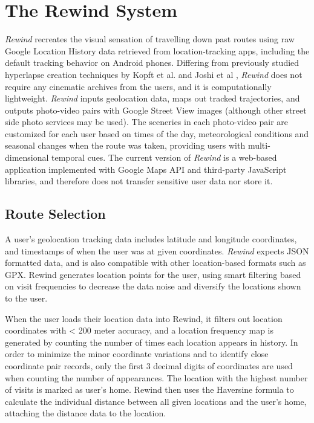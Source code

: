 \documentclass{sigchi}
\begin{document}
\section{The Rewind System}
\textit{Rewind} recreates the visual sensation of travelling down past routes using raw Google Location History data retrieved from location-tracking apps, including the default tracking behavior on Android phones. Differing from previously studied hyperlapse creation techniques by Kopft et al. and Joshi et al \cite{Kopf:2014:FHV:2601097.2601195, Joshi:2015:RHC:2809654.2766954}, \textit{Rewind} does not require any cinematic archives from the users, and it is computationally lightweight. \textit{Rewind} inputs geolocation data, maps out tracked trajectories, and outputs photo-video pairs with Google Street View images (although other street side photo services may be used). The sceneries in each photo-video pair are customized for each user based on times of the day, meteorological conditions and seasonal changes when the route was taken, providing users with multi-dimensional temporal cues. The current version of \textit{Rewind} is a web-based application implemented with Google Maps API and third-party JavaScript libraries, and therefore does not transfer sensitive user data nor store it. %


\subsection{Route Selection}
A user's geolocation tracking data includes latitude and longitude coordinates, and timestamps of when the user was at given coordinates. \textit{Rewind} expects JSON formatted data, and is also compatible with other location-based formats such as GPX. Rewind generates location points for the user, using smart filtering based on visit frequencies to decrease the data noise and diversify the locations shown to the user.

When the user loads their location data into Rewind, it filters out location coordinates with < 200 meter accuracy, and a location frequency map is generated by counting the number of times each location appears in history. In order to minimize the minor coordinate variations and to identify close coordinate pair records, only the first 3 decimal digits of coordinates are used when counting the number of appearances. The location with the highest number of visits is marked as user's home. Rewind then uses the Haversine formula to calculate the individual distance between all given locations and the user's home, attaching the distance data to the location.
\end{document}
